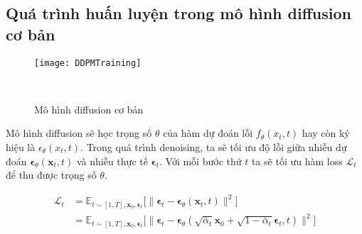 



\subsection{Quá trình huấn luyện trong mô hình diffusion cơ bản}
	
	\begin{figure}[H]
		\centering
		\texttt{[image: DDPMTraining]}
		\caption{Mô hình diffusion cơ bản}
		\label{fig:basic_diffusion}\
		\vspace{-5pt}
	\end{figure}
	
	Mô hình diffusion sẽ học trọng số $\theta$ của hàm dự đoán lỗi $f_{\theta} (x_t, t)$ hay còn ký hiệu là  $\epsilon_{\theta} (x_t, t)$. Trong quá trình denoising, ta sẽ tối ưu độ lỗi giữa nhiễu dự đoán $\boldsymbol{\epsilon}_\theta(\mathbf{x}_t, t)$ và nhiễu thực tế $\boldsymbol{\epsilon}_t$. Với mỗi bước thứ $t$ ta sẽ tối ưu hàm loss $\mathcal{L}_{t}$ để thu được trọng số $\theta$.
	
	\begin{equation}
		\label{eq:diffusion_loss}
		\begin{aligned}
			\mathcal{L}_t
			&= \mathbb{E}_{t \sim [1, T], \mathbf{x}_0, \boldsymbol{\epsilon}_t} \Big[\|\boldsymbol{\epsilon}_t - \boldsymbol{\epsilon}_\theta(\mathbf{x}_t, t)\|^2 \Big] \\
			&= \mathbb{E}_{t \sim [1, T], \mathbf{x}_0, \boldsymbol{\epsilon}_t} \Big[\|\boldsymbol{\epsilon}_t - \boldsymbol{\epsilon}_\theta(\sqrt{\bar{\alpha}_t}\mathbf{x}_0 + \sqrt{1 - \bar{\alpha}_t}\boldsymbol{\epsilon}_t, t)\|^2 \Big]
		\end{aligned}
	\end{equation}


